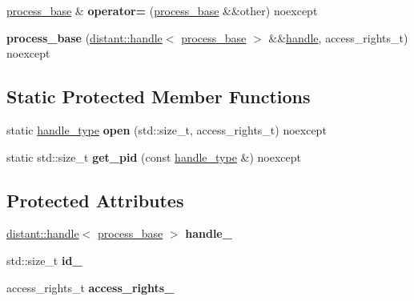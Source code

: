 \begin{DoxyCompactItemize}
\mbox{\hyperlink{classdistant_1_1kernel__objects_1_1process__base}{process\+\_\+base}} \& {\bfseries operator=} (\mbox{\hyperlink{classdistant_1_1kernel__objects_1_1process__base}{process\+\_\+base}} \&\&other) noexcept
\item 
\mbox{\label{classdistant_1_1kernel__objects_1_1process__base_a80ae44cbed38950723309d0a567af7c1}} 
{\bfseries process\+\_\+base} (\mbox{\hyperlink{classdistant_1_1handle}{distant\+::handle}}$<$ \mbox{\hyperlink{classdistant_1_1kernel__objects_1_1process__base}{process\+\_\+base}} $>$ \&\&\mbox{\hyperlink{classdistant_1_1handle}{handle}}, access\+\_\+rights\+\_\+t) noexcept
\end{DoxyCompactItemize}
\subsection*{Static Protected Member Functions}
\begin{DoxyCompactItemize}
\item 
\mbox{\label{classdistant_1_1kernel__objects_1_1process__base_a4bad2a3570c2e76ded4a8bd22f4928a9}} 
static \mbox{\hyperlink{classdistant_1_1handle}{handle\+\_\+type}} {\bfseries open} (std\+::size\+\_\+t, access\+\_\+rights\+\_\+t) noexcept
\item 
\mbox{\label{classdistant_1_1kernel__objects_1_1process__base_a7bec537ad007e7439f81fc95c965958d}} 
static std\+::size\+\_\+t {\bfseries get\+\_\+pid} (const \mbox{\hyperlink{classdistant_1_1handle}{handle\+\_\+type}} \&) noexcept
\end{DoxyCompactItemize}
\subsection*{Protected Attributes}
\begin{DoxyCompactItemize}
\item 
\mbox{\label{classdistant_1_1kernel__objects_1_1process__base_aa2f7eeea4b9769e9ebda10d907fea830}} 
\mbox{\hyperlink{classdistant_1_1handle}{distant\+::handle}}$<$ \mbox{\hyperlink{classdistant_1_1kernel__objects_1_1process__base}{process\+\_\+base}} $>$ {\bfseries handle\+\_\+}
\item 
\mbox{\label{classdistant_1_1kernel__objects_1_1process__base_a7fb322f6d108727fb48a986ac88a3199}} 
std\+::size\+\_\+t {\bfseries id\+\_\+}
\item 
\mbox{\label{classdistant_1_1kernel__objects_1_1process__base_af4f78745cb41d78979cc313b6e91f3b3}} 
access\+\_\+rights\+\_\+t {\bfseries access\+\_\+rights\+\_\+}
\end{DoxyCompactItemize}
